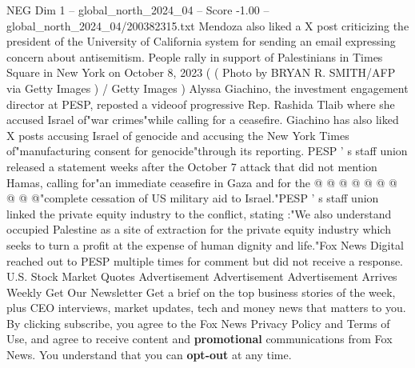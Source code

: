 \begin{textsample}{NEG Dim 1 – global\_north\_2024\_04 – Score -1.00 – global\_north\_2024\_04/200382315.txt}
Mendoza also liked a X post criticizing the president of the University of California system for sending an email expressing concern about antisemitism.
People rally in support of Palestinians in Times Square in New York on October 8, 2023 ( ( Photo by BRYAN R.
SMITH/AFP via Getty Images ) / Getty Images ) Alyssa Giachino, the investment engagement director at PESP, reposted a videoof progressive Rep.
Rashida Tlaib where she accused Israel of"war crimes"while calling for a ceasefire.
Giachino has also liked X posts accusing Israel of genocide and accusing the New York Times of"manufacturing consent for genocide"through its reporting.
PESP ' s staff union released a statement weeks after the October 7 attack that did not mention Hamas, calling for"an immediate ceasefire in Gaza and for the @ @ @ @ @ @ @ @ @ @"complete cessation of US military aid to Israel."PESP ' s staff union linked the private equity industry to the conflict, stating :"We also understand occupied Palestine as a site of extraction for the private equity industry which seeks to turn a profit at the expense of human dignity and life."Fox News Digital reached out to PESP multiple times for comment but did not receive a response.
U.S.
Stock Market Quotes Advertisement Advertisement Advertisement Arrives Weekly Get Our Newsletter Get a brief on the top business stories of the week, plus CEO interviews, market updates, tech and money news that matters to you.
By clicking subscribe, you agree to the Fox News Privacy Policy and Terms of Use, and agree to receive content and \textbf{promotional} communications from Fox News.
You understand that you can \textbf{opt-out} at any time.

\end{textsample}
